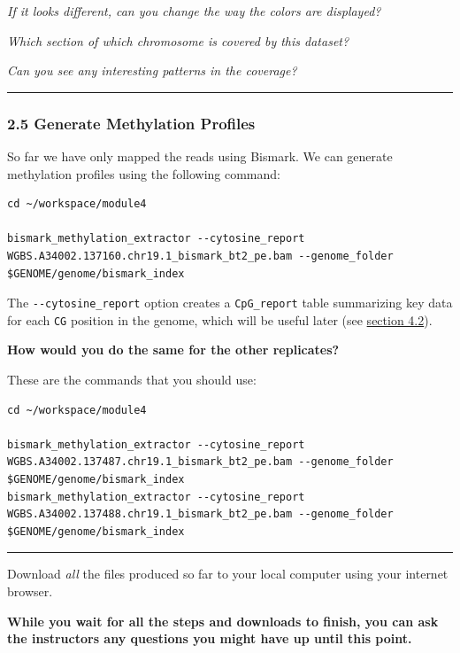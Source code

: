 \documentclass[
]{book}
\begin{document}
\emph{If it looks different, can you change the way the colors are displayed?}

\emph{Which section of which chromosome is covered by this dataset?}

\emph{Can you see any interesting patterns in the coverage?}

\begin{center}\rule{0.5\linewidth}{0.5pt}\end{center}

\subsubsection{2.5 Generate Methylation Profiles}\label{generate-methylation-profiles}

So far we have only mapped the reads using Bismark. We can generate methylation profiles using the following command:

\begin{verbatim}
cd ~/workspace/module4

bismark_methylation_extractor --cytosine_report WGBS.A34002.137160.chr19.1_bismark_bt2_pe.bam --genome_folder $GENOME/genome/bismark_index
\end{verbatim}

The \texttt{-\/-cytosine\_report} option creates a \texttt{CpG\_report} table summarizing key data for each \texttt{CG} position in the genome, which will be useful later (see \hyperref[r_dss_import]{section 4.2}).

\textbf{How would you do the same for the other replicates?}

These are the commands that you should use:

\begin{verbatim}
cd ~/workspace/module4

bismark_methylation_extractor --cytosine_report WGBS.A34002.137487.chr19.1_bismark_bt2_pe.bam --genome_folder $GENOME/genome/bismark_index
bismark_methylation_extractor --cytosine_report WGBS.A34002.137488.chr19.1_bismark_bt2_pe.bam --genome_folder $GENOME/genome/bismark_index
\end{verbatim}

\begin{center}\rule{0.5\linewidth}{0.5pt}\end{center}

Download \emph{all} the files produced so far to your local computer using your internet browser.

\textbf{While you wait for all the steps and downloads to finish, you can ask the instructors any questions you might have up until this point.}
\end{document}
